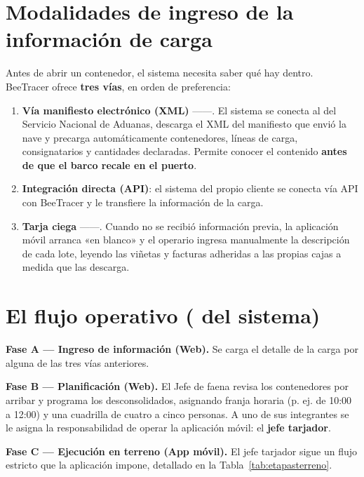 \section{Modalidades de ingreso de la información de carga}
\label{sec:modalidades}

Antes de abrir un contenedor, el sistema necesita saber qué hay dentro. BeeTracer ofrece
\textbf{tres vías}, en orden de preferencia:

\begin{enumerate}
    \item \textbf{Vía manifiesto electrónico (XML)} ------. El sistema se
          conecta al  del Servicio Nacional de Aduanas, descarga el XML del
          manifiesto que envió la nave y precarga automáticamente contenedores, líneas de carga,
          consignatarios y cantidades declaradas. Permite conocer el contenido \textbf{antes de que
          el barco recale en el puerto}.
    \item \textbf{Integración directa (API)}: el sistema del propio cliente se conecta vía API con
          BeeTracer y le transfiere la información de la carga.
    \item \textbf{Tarja ciega} ------. Cuando no se recibió
          información previa, la aplicación móvil arranca «en blanco» y el operario ingresa
          manualmente la descripción de cada lote, leyendo las viñetas y facturas adheridas a las
          propias cajas a medida que las descarga.
\end{enumerate}

\section{El flujo operativo ( del sistema)}
\label{sec:flujo}

\textbf{Fase A --- Ingreso de información (Web).} Se carga el detalle de la carga por alguna de las
tres vías anteriores.

\noindent \textbf{Fase B --- Planificación (Web).} El Jefe de faena revisa los contenedores por arribar y
programa los desconsolidados, asignando franja horaria (p. ej. de 10:00 a 12:00) y una cuadrilla de
cuatro a cinco personas. A uno de sus integrantes se le asigna la responsabilidad de operar la
aplicación móvil: el \textbf{jefe tarjador}.

\noindent \textbf{Fase C --- Ejecución en terreno (App móvil).} El jefe tarjador sigue un flujo estricto que
la aplicación impone, detallado en la Tabla~\ref{tab:etapasterreno}.

